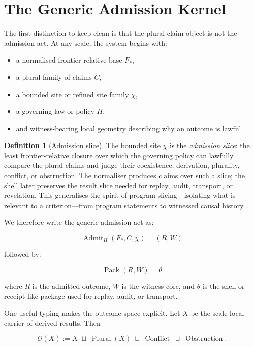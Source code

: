 \documentclass[11pt]{article}
\theoremstyle{definition}
\newtheorem{definition}{Definition}[section]
\theoremstyle{plain}
\theoremstyle{remark}
\begin{document}
\section{The Generic Admission Kernel}

The first distinction to keep clean is that the plural claim object is not the admission act. At any scale, the system begins with:

\begin{itemize}[leftmargin=*]
  \item a normalised frontier-relative base \(F_*\),
  \item a plural family of claims \(C\),
  \item a bounded site or refined site family \(\chi\),
  \item a governing law or policy \(\Pi\),
  \item and witness-bearing local geometry describing why an outcome is lawful.
\end{itemize}

\begin{definition}[Admission slice]
The bounded site \(\chi\) is the \emph{admission slice}: the least frontier-relative closure over which the governing policy can lawfully compare the plural claims and judge their coexistence, derivation, plurality, conflict, or obstruction. The normaliser produces claims over such a slice; the shell later preserves the result slice needed for replay, audit, transport, or revelation. This generalises the spirit of program slicing---isolating what is relevant to a criterion---from program statements to witnessed causal history \cite{weiser1981program}.
\end{definition}

We therefore write the generic admission act as:

\[
\operatorname{Admit}_{\Pi}(F_*, C, \chi) = (R, W)
\]

followed by:

\[
\operatorname{Pack}(R, W) = \theta
\]

where \(R\) is the admitted outcome, \(W\) is the witness core, and \(\theta\) is the shell or receipt-like package used for replay, audit, or transport.

One useful typing makes the outcome space explicit. Let \(X\) be the
scale-local carrier of derived results. Then

\[
\mathcal{O}(X)
:=
X
\;\sqcup\;
\operatorname{Plural}(X)
\;\sqcup\;
\operatorname{Conflict}
\;\sqcup\;
\operatorname{Obstruction}.
\]
\end{document}
